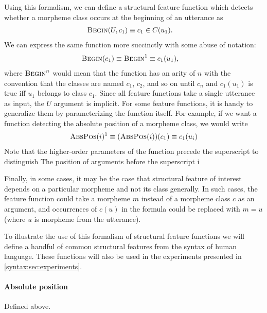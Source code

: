 Using this formalism, we can define a structural feature function which detects whether a morpheme class occurs at the beginning of an utterance as
\begin{align}
  \textsc{Begin}(U, c_1) &\equiv c_1 \in C(u_1)
  .
\end{align}
We can express the same function more succinctly with some abuse of notation:
\begin{align}
  \textsc{Begin}(c_1) \equiv \textsc{Begin}^1 &\equiv c_1(u_1)
  ,
\end{align}
where $\textsc{Begin}^n$ would mean that the function has an arity of $n$ with the convention that the classes are named $c_1$, $c_2$, and so on until $c_n$
  and $c_1(u_1)$ is true iff $u_1$ belongs to class $c_1$.
Since all feature functions take a single utterance as input, the $U$ argument is implicit.
For some feature functions, it is handy to generalize them by parameterizing the function itself.
For example, if we want a function detecting the absolute position of a morpheme class, we would write
\begin{align}
  \textsc{AbsPos}(i)^1 \equiv (\textsc{AbsPos}(i))(c_1) \equiv c_1(u_i)
\end{align}
Note that the higher-order parameters of the function precede the superscript to distinguish The position of arguments before the superscript i

Finally, in some cases, it may be the case that structural feature of interest depends on a particular morpheme and not its class generally.
In such cases, the feature function could take a morpheme $m$ instead of a morpheme class $c$ as an argument, and occurrences of $c(u)$ in the formula could be replaced with $m = u$ (where $u$ is morpheme from the utterance).

To illustrate the use of this formalism of structural feature functions we will define a handful of common structural features from the syntax of human language.
These functions will also be used in the experiments presented in \cref{syntax:sec:experiments}.

\paragraph{Absolute position}
Defined above.

